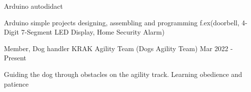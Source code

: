 \begin{cventries}
  \cventry
    {} %
    {Arduino autodidact} %
    {} %
    {} %
    {
      \begin{cvitems} %
        \item {Arduino simple projects designing, assembling and programming f.ex(doorbell, 4-Digit 7-Segment LED Display, Home Security Alarm)}
      \end{cvitems}
    }



  \cventry
    {Member, Dog handler} %
    {KRAK Agility Team  (Dogs Agility Team)} %
    {} %
    {Mar 2022 - Present} %
    {
      \begin{cvitems} %
        \item {Guiding the dog through obstacles on the agility track. Learning obedience and patience}
      \end{cvitems}
    }

\end{cventries}
